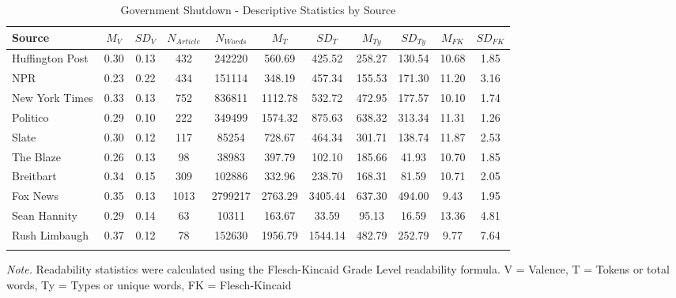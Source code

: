 \documentclass[
  english,
  man,floatsintext]{apa6}
\begin{document}
\begin{table}[h]

\begin{center}
\begin{threeparttable}

\caption{\label{tab:exp2-source-descriptives-gs}Government Shutdown - Descriptive Statistics by Source}

\footnotesize{

\begin{tabular}{lcccccccccc}
\toprule
Source & $M_V$ & $SD_V$ & $N_{Article}$ & $N_{Words}$ & $M_T$ & $SD_T$ & $M_{Ty}$ & $SD_{Ty}$ & $M_{FK}$ & $SD_{FK}$\\
\midrule
Huffington Post & 0.30 & 0.13 & 432 & 242220 & 560.69 & 425.52 & 258.27 & 130.54 & 10.68 & 1.85\\
NPR & 0.23 & 0.22 & 434 & 151114 & 348.19 & 457.34 & 155.53 & 171.30 & 11.20 & 3.16\\
New York Times & 0.33 & 0.13 & 752 & 836811 & 1112.78 & 532.72 & 472.95 & 177.57 & 10.10 & 1.74\\
Politico & 0.29 & 0.10 & 222 & 349499 & 1574.32 & 875.63 & 638.32 & 313.34 & 11.31 & 1.26\\
Slate & 0.30 & 0.12 & 117 & 85254 & 728.67 & 464.34 & 301.71 & 138.74 & 11.87 & 2.53\\
The Blaze & 0.26 & 0.13 & 98 & 38983 & 397.79 & 102.10 & 185.66 & 41.93 & 10.70 & 1.85\\
Breitbart & 0.34 & 0.15 & 309 & 102886 & 332.96 & 238.70 & 168.31 & 81.59 & 10.71 & 2.05\\
Fox News & 0.35 & 0.13 & 1013 & 2799217 & 2763.29 & 3405.44 & 637.30 & 494.00 & 9.43 & 1.95\\
Sean Hannity & 0.29 & 0.14 & 63 & 10311 & 163.67 & 33.59 & 95.13 & 16.59 & 13.36 & 4.81\\
Rush Limbaugh & 0.37 & 0.12 & 78 & 152630 & 1956.79 & 1544.14 & 482.79 & 252.79 & 9.77 & 7.64\\
\bottomrule
\addlinespace
\end{tabular}

}

\begin{tablenotes}[para]
\normalsize{\textit{Note.} Readability statistics were calculated using the Flesch-Kincaid Grade Level readability formula. V = Valence, T = Tokens or total words, Ty = Types or unique words, FK = Flesch-Kincaid}
\end{tablenotes}

\end{threeparttable}
\end{center}

\end{table}
\end{document}
